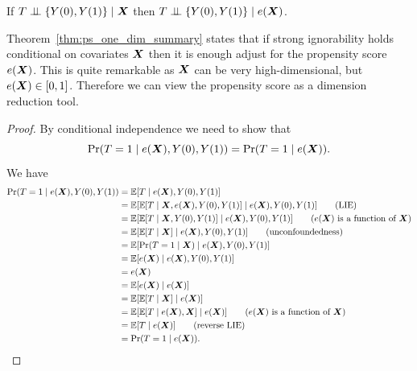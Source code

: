 \documentclass[11pt]{exam}
\begin{document}
\begin{theorem}\label{thm:ps_one_dim_summary}
    If $T \perp\!\!\!\perp \{Y(0), Y(1)\} \mid \bm{X}$ then $T \perp\!\!\!\perp \{Y(0), Y(1)\} \mid e(\bm{X})$.
\end{theorem}
Theorem~\ref{thm:ps_one_dim_summary} states that if strong ignorability holds conditional on covariates $\bm{X}$ then it is enough adjust for the propensity score $e(\bm{X})$. This is quite remarkable as $\bm{X}$ can be very high-dimensional, but $e(\bm{X}) \in [0, 1]$. Therefore we can view the propensity score as a dimension reduction tool.
\begin{proof}
    By conditional independence we need to show that
    \[
    \Pr(T = 1\mid e(\bm{X}), Y(0), Y(1)) = \Pr(T = 1\mid e(\bm{X})).
    \]
    We have
    \begin{align*}
        \Pr(T = 1 \mid e(\bm{X}), Y(0), Y(1)) &= \mathbb{E}[T \mid e(\bm{X}), Y(0), Y(1)]
        \\
        &= \mathbb{E}[\mathbb{E}[T \mid \bm{X}, e(\bm{X}), Y(0), Y(1)] \mid e(\bm{X}), Y(0), Y(1)] \qquad \text{(LIE)}
        \\
        &= \mathbb{E}[\mathbb{E}[T \mid \bm{X}, Y(0), Y(1)] \mid e(\bm{X}), Y(0), Y(1)] \qquad (e(\bm{X}) \text{ is a function of } \bm{X})
        \\
        &= \mathbb{E}[\mathbb{E}[T \mid \bm{X}] \mid e(\bm{X}), Y(0), Y(1)] \qquad (\text{unconfoundedness})
        \\
        &= \mathbb{E}[\Pr(T = 1\mid \bm{X}) \mid e(\bm{X}), Y(0), Y(1)]
        \\
        &= \mathbb{E}[e(\bm{X}) \mid e(\bm{X}), Y(0), Y(1)]
        \\
        &= e(\bm{X})
        \\
        &= \mathbb{E}[e(\bm{X}) \mid e(\bm{X})]
        \\
        &= \mathbb{E}[\mathbb{E}[T \mid \bm{X}] \mid e(\bm{X})]
        \\
        &= \mathbb{E}[\mathbb{E}[T \mid e(\bm{X}), \bm{X}] \mid e(\bm{X})] \qquad (e(\bm{X}) \text{ is a function of } \bm{X})
        \\
        &= \mathbb{E}[T \mid e(\bm{X})]  \qquad (\text{reverse LIE})
        \\
        &= \Pr(T = 1\mid e(\bm{X})).
    \end{align*}
\end{proof}
\end{document}
